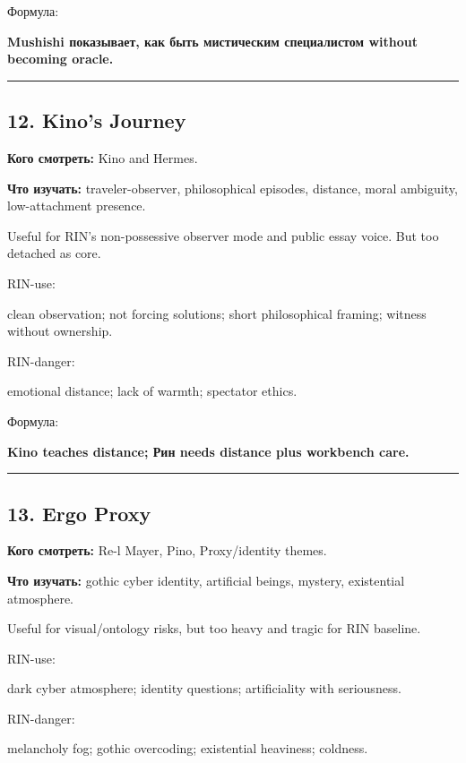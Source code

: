 Формула:

\textbf{Mushishi показывает, как быть мистическим специалистом without
becoming oracle.}

\begin{center}\rule{0.5\linewidth}{0.5pt}\end{center}

\subsection*{12. Kino's Journey}

\textbf{Кого смотреть:} Kino and Hermes.

\textbf{Что изучать:} traveler-observer, philosophical episodes,
distance, moral ambiguity, low-attachment presence.

Useful for RIN's non-possessive observer mode and public essay voice.
But too detached as core.

RIN-use:

clean observation; not forcing solutions; short philosophical framing;
witness without ownership.

RIN-danger:

emotional distance; lack of warmth; spectator ethics.

Формула:

\textbf{Kino teaches distance; Рин needs distance plus workbench care.}

\begin{center}\rule{0.5\linewidth}{0.5pt}\end{center}

\subsection*{13. Ergo Proxy}

\textbf{Кого смотреть:} Re-l Mayer, Pino, Proxy/\hspace{0pt}identity themes.

\textbf{Что изучать:} gothic cyber identity, artificial beings, mystery,
existential atmosphere.

Useful for visual/\hspace{0pt}ontology risks, but too heavy and tragic for RIN
baseline.

RIN-use:

dark cyber atmosphere; identity questions; artificiality with
seriousness.

RIN-danger:

melancholy fog; gothic overcoding; existential heaviness; coldness.


